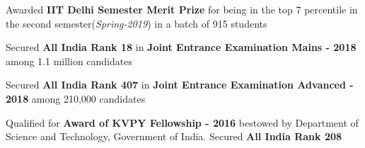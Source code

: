 
\begin{cventries}
    \begin{cvitems}
        \item{Awarded \textbf{IIT Delhi Semester Merit Prize} for being in the top 7 percentile in the second semester(\textit{Spring-2019}) in a batch of 915 students}
        \vspace{5pt}
        \item{Secured \textbf{All India Rank 18} in \textbf{Joint Entrance Examination Mains - 2018} among 1.1 million candidates}
        \vspace{5pt}
        \item{Secured \textbf{All India Rank 407} in \textbf{Joint Entrance Examination Advanced - 2018} among 210,000 candidates}
        \vspace{5pt}
        \item{Qualified for \textbf{Award of KVPY Fellowship - 2016} bestowed by Department of Science and Technology,
Government of India. Secured \textbf{All India Rank 208} }
        \vspace{5pt}
    \end{cvitems}
\end{cventries}